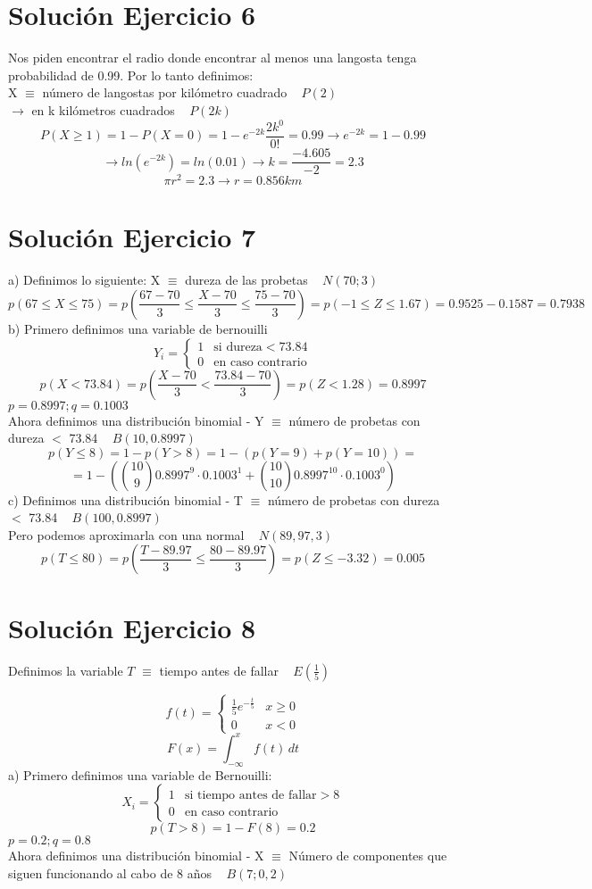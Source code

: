 \documentclass[fleqn]{article}
\begin{document}
	\section{Solución Ejercicio 6}
	Nos piden encontrar el radio donde encontrar al menos una langosta tenga probabilidad de 0.99. Por lo tanto definimos: \\
	X $\equiv$ número de langostas por kilómetro cuadrado ~ $P(2)$ \\
	$\rightarrow$ en k kilómetros cuadrados ~ $P(2k)$
	\[
	P(X \geq 1) = 1 - P(X=0) = 1 - e^{-2k}\frac{2k^0}{0!} = 0.99 \rightarrow e^{-2k} = 1 - 0.99 
	\]
	\[
	\rightarrow ln(e^{-2k}) = ln(0.01) \rightarrow k = \frac{-4.605}{-2} = 2.3
	\]
	\[
	\pi r^2 = 2.3 \rightarrow \boxed{r = 0.856 km}
	\]
	\section{Solución Ejercicio 7}
	a) Definimos lo siguiente: X $\equiv$ dureza de las probetas ~ $N(70;3)$
	\[
	p(67 \leq X \leq 75) = p(\frac{67-70}{3} \leq \frac{X-70}{3} \leq \frac{75-70}{3}) = p(-1 \leq Z \leq 1.67) = 0.9525 - 0.1587 = \boxed{0.7938}
	\]
	b) Primero definimos una variable de bernouilli
	\[
	Y_i = 
	\begin{cases}
		1 & \text{si dureza} < 73.84 \\
		0 & \text{en caso contrario}
	\end{cases}
	\]
	\[
	p(X < 73.84) = p(\frac{X-70}{3} < \frac{73.84-70}{3}) = p(Z < 1.28) = 0.8997 
	\]
	$p = 0.8997 ; q = 0.1003$ \\
	Ahora definimos una distribución binomial - Y $\equiv$ número de probetas con dureza $<$ 73.84 ~ $B(10,0.8997)$
	\[
	p(Y \leq 8) = 1 - p(Y > 8) = 1 - (p(Y = 9) + p(Y = 10)) =
	\]
	\[
	= \boxed{1 - (\binom{10}{9}0.8997^{9}\cdot0.1003^{1} + \binom{10}{10}0.8997^{10}\cdot0.1003^{0})}
	\]
	c) Definimos una distribución binomial - T $\equiv$ número de probetas con dureza $<$ 73.84 ~ $B(100,0.8997)$ \\
	Pero podemos aproximarla con una normal ~ $N(89,97, 3)$
	\[
	p(T \leq 80) = p(\frac{T-89.97}{3} \leq \frac{80-89.97}{3}) = p(Z \leq -3.32) = \boxed{0.005}
	\]
	\section{Solución Ejercicio 8}
	Definimos la variable $T$ $\equiv$ tiempo antes de fallar ~ $E(\frac{1}{5})$
	
	\[
	f(t) = 
	\begin{cases}
		\frac{1}{5} e^{-\frac{t}{5}} 	& x \geq 0 \\
		0 								& x < 0
	\end{cases}
	\]
	\[
	F(x) = \int_{-\infty}^{x} f(t) \, dt
	\]			
	a) Primero definimos una variable de Bernouilli:
	\[
	X_i = 
	\begin{cases}
		1 & \text{si tiempo antes de fallar} > 8 \\
		0 & \text{en caso contrario}
	\end{cases}
	\]
	\[
	p(T > 8) = 1 - F(8) = 0.2
	\]	
	$p = 0.2 ; q = 0.8$ \\
	Ahora definimos una distribución binomial - X $\equiv$ Número de componentes que siguen funcionando al cabo de 8 años ~ $B(7;0,2)$
			
\end{document}
